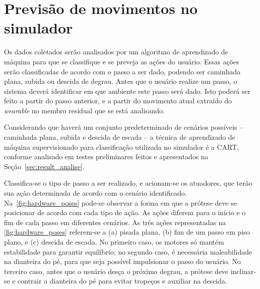 \section{Previsão de movimentos no simulador}\label{sec:metodo_previsao}

Os dados coletados serão analisados por um algoritmo de aprendizado de máquina para que se classifique e se preveja as ações do usuário. Essas ações serão classificadas de acordo com o passo a ser dado, podendo ser caminhada plana, subida ou descida de degrau.
% 
Antes que o usuário realize um passo, o sistema deverá identificar em que ambiente este passo será dado. Isto poderá ser feito a partir do passo anterior, 
e a partir do movimento atual extraído do \textit{wearable} no membro residual que se está analisando.

Considerando que haverá um conjunto predeterminado de cenários possíveis -- caminhada plana, subida e descida de escada -- 
a técnica de aprendizado de máquina supervisionado para classificação utilizada no simulador é a CART, conforme analisado em testes preliminares feitos e apresentados na Seção~\ref{sec:result_analise}.

Classifica-se o tipo de passo a ser realizado, e acionam-se os atuadores, que terão sua ação determinada de acordo com o cenário identificado. Na~\autoref{fig:hardware_poses} pode-se observar a forma em que a prótese deve se posicionar de acordo com cada tipo de ação. As ações diferem para o início e o fim de cada passo em diferentes cenários.
% 
As três ações representadas na \autoref{fig:hardware_poses} referem-se a (a) pisada plana, (b) fim de um passo em piso plano, e (c) descida de escada. No primeiro caso, os motores só mantém estabilidade para garantir equilíbrio; no segundo caso, é necessária maleabilidade na dianteira do pé, para que seja possível impulsionar o passo do usuário. No terceiro caso, antes que o usuário desça o próximo degrau, a prótese deve inclinar-se e contrair a dianteira do pé para evitar tropeços e auxiliar na descida.

